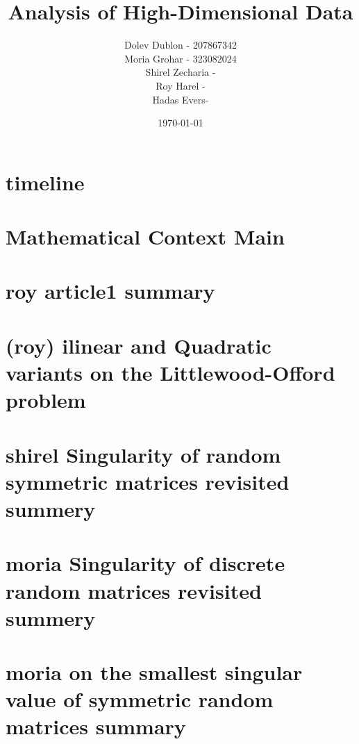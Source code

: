 \documentclass[12pt]{article}
\title{\textbf{Analysis of High-Dimensional Data}}
\author{
    Dolev Dublon - 207867342\\
    Moria Grohar - 323082024\\ 
    Shirel Zecharia - \\
    Roy Harel - \\
    Hadas Evers-
}
\date{\today}
\begin{document}
\maketitle


\tableofcontents

\newpage





\section{timeline}



\section{Mathematical Context Main}



\section{roy article1 summary}



\section{(roy) ilinear and Quadratic variants on the Littlewood-Offord problem}



\section{shirel Singularity of random symmetric matrices revisited summery}



\section{moria Singularity of discrete random matrices revisited summery}



\section{moria on the smallest singular value of symmetric random matrices summary}
\end{document}
